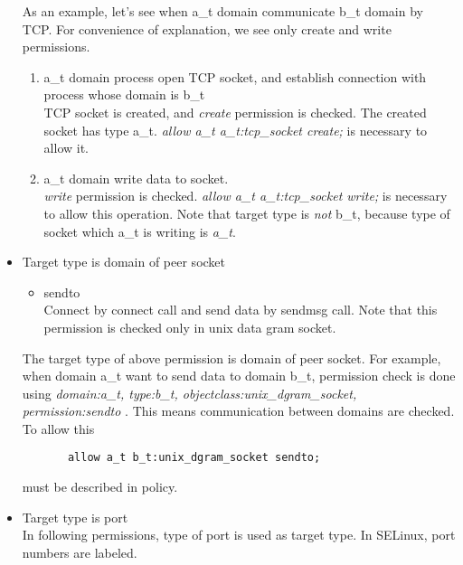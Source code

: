 \documentclass{article}
\begin{document}
\begin{itemize}
       As an example, let's see when a\_t domain communicate b\_t
       domain by TCP. 
       For convenience of explanation, we see
       only create and write permissions. 
       \begin{enumerate}
	\item a\_t domain process open TCP socket, and establish connection with
	      process whose domain is b\_t\\
	      TCP socket is created, and {\it create} permission is
	      checked. The created socket has type a\_t.
	      {\it allow a\_t a\_t:tcp\_socket create;} is necessary to
	      allow it.
	\item a\_t domain write data to socket.\\
	      {\it write } permission is checked.
	      {\it allow a\_t a\_t:tcp\_socket write;} is necessary to
	      allow this operation. Note that target type is {\it not}
	      b\_t, because type of socket which a\_t is writing is {\it
	      a\_t}.	      
       \end{enumerate}
       
 \item Target type is domain of peer socket\\
       \begin{itemize}
	\item sendto\\
	      Connect by connect call and send data by sendmsg
	      call. Note that this permission is checked only in unix
	      data gram socket.
       \end{itemize}
       The target type of above permission is domain of peer socket. 
       For example, when domain a\_t want to send data to domain b\_t,
       permission check is done using {\it domain:a\_t, type:b\_t,
       objectclass:unix\_dgram\_socket, permission:sendto }. This
       means communication between domains are checked. To allow this       
	\begin{verbatim}
       allow a_t b_t:unix_dgram_socket sendto;			
	\end{verbatim}
       must be described in policy.         
 \item Target type is port\\
       In following permissions, type of port is used as target
       type. In SELinux, port numbers are labeled.


\end{itemize}
\end{document}
